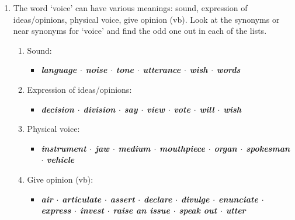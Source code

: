 \documentclass[10pt,a4paper,table]{article}
\begin{document}
\begin{enumerate}[label=\arabic*., leftmargin=*]
  \item The word `voice' can have various meanings: sound, expression of ideas/opinions, physical voice, give opinion (vb). Look at the synonyms or near synonyms for `voice' and find the odd one out in each of the lists.
  \begin{enumerate}[label=\textbf{\alph*.}, leftmargin=1.5em]
    \item Sound:
    \begin{itemize}[label=$\blacksquare$, leftmargin=2em]
      \item \textbf{\textit{language $\cdot$ noise $\cdot$ tone $\cdot$ utterance $\cdot$ wish $\cdot$ words}}
    \end{itemize}

    \item Expression of ideas/opinions:
    \begin{itemize}[label=$\blacksquare$, leftmargin=2em]
      \item \textbf{\textit{decision $\cdot$ division $\cdot$ say $\cdot$ view $\cdot$ vote $\cdot$ will $\cdot$ wish}}
    \end{itemize}

    \item Physical voice:
    \begin{itemize}[label=$\blacksquare$, leftmargin=2em]
      \item \textbf{\textit{instrument $\cdot$ jaw $\cdot$ medium $\cdot$ mouthpiece $\cdot$ organ $\cdot$ spokesman $\cdot$ vehicle}}
    \end{itemize}

    \item Give opinion (vb):
    \begin{itemize}[label=$\blacksquare$, leftmargin=2em]
      \item \textbf{\textit{air $\cdot$ articulate $\cdot$ assert $\cdot$ declare $\cdot$ divulge $\cdot$ enunciate $\cdot$ express $\cdot$ invest $\cdot$ raise an issue $\cdot$ speak out $\cdot$ utter}}
    \end{itemize}
  \end{enumerate}


\end{enumerate}
\end{document}
